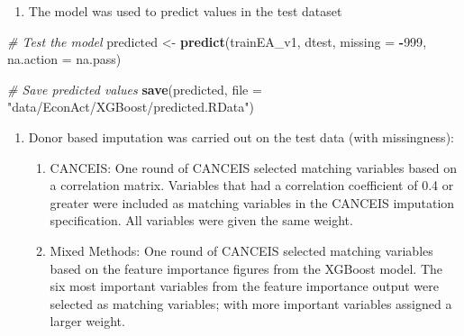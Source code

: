 \documentclass[]{book}
\newenvironment{Shaded}{\begin{snugshade}}{\end{snugshade}}
\newcommand{\KeywordTok}[1]{\textcolor[rgb]{0.13,0.29,0.53}{\textbf{#1}}}
\newcommand{\DataTypeTok}[1]{\textcolor[rgb]{0.13,0.29,0.53}{#1}}
\newcommand{\DecValTok}[1]{\textcolor[rgb]{0.00,0.00,0.81}{#1}}
\newcommand{\StringTok}[1]{\textcolor[rgb]{0.31,0.60,0.02}{#1}}
\newcommand{\CommentTok}[1]{\textcolor[rgb]{0.56,0.35,0.01}{\textit{#1}}}
\newcommand{\OperatorTok}[1]{\textcolor[rgb]{0.81,0.36,0.00}{\textbf{#1}}}
\newcommand{\NormalTok}[1]{#1}
\providecommand{\tightlist}{%
  \setlength{\itemsep}{0pt}\setlength{\parskip}{0pt}}
\begin{document}
\begin{enumerate}
\def\labelenumi{\arabic{enumi})}
\setcounter{enumi}{5}
\tightlist
\item
  The model was used to predict values in the test dataset
\end{enumerate}

\begin{Shaded}
\begin{Highlighting}[]
\CommentTok{# Test the model}
\NormalTok{predicted <-}\StringTok{ }\KeywordTok{predict}\NormalTok{(trainEA_v1, dtest, }\DataTypeTok{missing =} \OperatorTok{-}\DecValTok{999}\NormalTok{, }\DataTypeTok{na.action =}\NormalTok{ na.pass)}

\CommentTok{# Save predicted values}
\KeywordTok{save}\NormalTok{(predicted, }\DataTypeTok{file =} \StringTok{"data/EconAct/XGBoost/predicted.RData"}\NormalTok{)}
\end{Highlighting}
\end{Shaded}

\begin{enumerate}
\def\labelenumi{\arabic{enumi})}
\setcounter{enumi}{6}
\tightlist
\item
  Donor based imputation was carried out on the test data (with
  missingness):

  \begin{enumerate}
  \def\labelenumii{\roman{enumii})}
  \tightlist
  \item
    CANCEIS: One round of CANCEIS selected matching variables based on a
    correlation matrix. Variables that had a correlation coefficient of
    \textbar{}0.4\textbar{} or greater were included as matching
    variables in the CANCEIS imputation specification. All variables
    were given the same weight.\\
  \item
    Mixed Methods: One round of CANCEIS selected matching variables
    based on the feature importance figures from the XGBoost model. The
    six most important variables from the feature importance output were
    selected as matching variables; with more important variables
    assigned a larger weight.
  \end{enumerate}
\end{enumerate}
\end{document}
